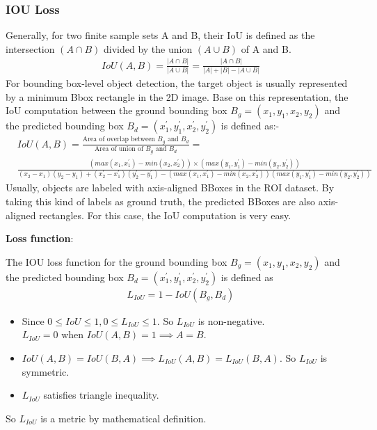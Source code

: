 \documentclass[12pt]{article}
\begin{document}
\subsubsection{IOU Loss}
Generally, for two finite sample sets A and B, their IoU is defined as the intersection $(A \cap B)$ divided by the union $(A \cup B)$ of A and B.
\begin{align*}
    IoU(A,B)=\frac{|A \cap B|}{|A \cup B|}=\frac{|A \cap B|}{|A|+|B|-|A \cup B|}
\end{align*}
For bounding box-level object detection, the target object is usually represented by a minimum Bbox rectangle in the 2D image. Base on this representation, the IoU computation between the ground bounding box $B_{g}=(x_{1} , y_{1} , x_{2} , y_{2} )$ and the predicted bounding box $B_{d}=(x_{1}^{\prime} , y_{1}^{\prime} , x_{2}^{\prime} , y_{2}^{\prime} )$ is defined as:-
\begin{align*}
    & IoU(A,B)=\frac{\text{Area of overlap between $B_{g}$ and $B_{d}$}}{\text{Area of union of $B_{g}$ and $B_{d}$}}=\\ 
    & \frac{(max(x_{1},x_{1}^{\prime})-min(x_{2},x_{2}^{\prime}))\times (max(y_{1},y_{1}^{\prime})-min(y_{2},y_{2}^{\prime}))}{(x_{2}-x_{1}) (y_{2}-y_{1})+(x_{2}^{\prime}-x_{1}^{\prime}) (y_{2}^{\prime}-y_{1}^{\prime})-(max(x_{1},x_{1}^{\prime})-min(x_{2},x_{2}^{\prime})) (max(y_{1},y_{1}^{\prime})-min(y_{2},y_{2}^{\prime}))}
\end{align*}
Usually, objects are labeled with axis-aligned BBoxes in the ROI dataset. By taking this kind of labels as ground truth, the predicted BBoxes are also axis-aligned rectangles. For this case, the IoU computation is very easy.

\begin{flushleft}
\textbf{Loss function}:
\end{flushleft}
The IOU loss function\cite{iou} for the ground bounding box $B_{g}=(x_{1} , y_{1} , x_{2} , y_{2} )$ and the predicted bounding box $B_{d}=(x_{1}^{\prime} , y_{1}^{\prime} , x_{2}^{\prime} , y_{2}^{\prime} )$ is defined as
\begin{align*}
    L_{IoU}=1-IoU(B_{g},B_{d})
\end{align*}
\begin{itemize}
    \item Since $0\leq IoU \leq 1, 0\leq L_{IoU} \leq 1$. So $L_{IoU}$ is non-negative. $L_{IoU}=0 \text{ when } IoU(A,B)=1 \implies A=B$.
    \item $IoU(A,B)=IoU(B,A) \implies L_{IoU}(A,B)=L_{IoU}(B,A)$. So $L_{IoU}$ is symmetric.
    \item $L_{IoU}$ satisfies triangle inequality.\cite{iou_te}
\end{itemize}
So $L_{IoU}$ is a metric by mathematical definition.
\end{document}
